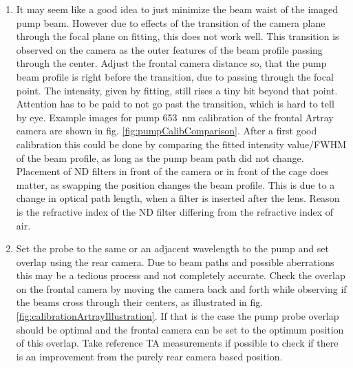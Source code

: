 \documentclass[twoside,openright,listof=numbered]{scrreprt}
\begin{document}
\begin{enumerate}
\item It may seem like a good idea to just minimize the beam waist of the imaged pump beam. However due to effects of the transition of the camera plane through the focal plane on fitting, this does not work well. This transition is observed on the camera as the outer features of the beam profile passing through the center. Adjust the frontal camera distance so, that the pump beam profile is right before the transition, due to passing through the focal point. The intensity, given by fitting, still rises a tiny bit beyond that point. Attention has to be paid to not go past the transition, which is hard to tell by eye. Example images for pump \qty{653}{\nano\meter} calibration of the frontal Artray camera are shown in fig. \ref{fig:pumpCalibComparison}. After a first good calibration this could be done by comparing the fitted intensity value/FWHM of the beam profile, as long as the pump beam path did not change. Placement of ND filters in front of the camera or in front of the cage does matter, as swapping the position changes the beam profile. This is due to a change in optical path length, when a filter is inserted after the lens. Reason is the refractive index of the ND filter differing from the refractive index of air.
\item Set the probe to the same or an adjacent wavelength to the pump and set overlap using the rear camera. Due to beam paths and possible aberrations this may be a tedious process and not completely accurate. Check the overlap on the frontal camera by moving the camera back and forth while observing if the beams cross through their centers, as illustrated in fig. \ref{fig:calibrationArtrayIllustration}. If that is the case the pump probe overlap should be optimal and the frontal camera can be set to the optimum position of this overlap. Take reference TA measurements if possible to check if there is an improvement from the purely rear camera based position.
\end{enumerate}
\end{document}
